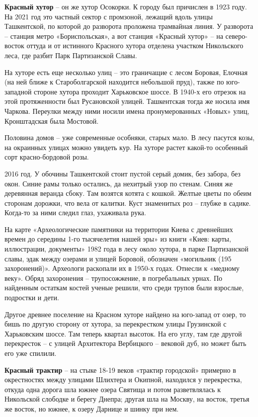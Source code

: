 \medskip


\textbf{Красный хутор} – он же хутор Осокорки. К городу был причислен в 1923 году. На 2021 год это частный сектор с промзоной, лежащий вдоль улицы Ташкентской, по которой до разворота проложена трамвайная линия. У разворота – станция метро «Бориспольская», а вот станция «Красный хутор» – на северо-восток оттуда и от истинного Красного хутора отделена участком Никольского леса, где разбит Парк Партизанской Славы.

На хуторе есть еще несколько улиц – это граничащие с лесом Боровая, Елочная (на ней ближе к Староболгарской находится небольшой пруд), также по юго-западной стороне хутора проходит Харьковское шоссе. В 1940-х его отрезок на этой протяженности был Русановской улицей. Ташкентская тогда же носила имя Чаркова. Переулки между ними носили имена пронумерованных «Новых» улиц, Кронштадская была Мостовой.

Половина домов – уже современные особняки, старых мало. В лесу пасутся козы, на окраинных улицах можно увидеть кур. На хуторе растет какой-то особенный сорт красно-бордовой розы.

2016 год. У обочины Ташкентской стоит пустой серый домик, без забора, без окон. Синие рамы только остались, да нехитрый узор по стенам. Синяя же деревянная веранда сбоку. Там возятся котята с кошкой. Желтые цветы по обеим сторонам дорожки, что вела от калитки. Куст знаменитых роз – глубже в садике. Когда-то за ними следил глаз, ухаживала рука.

На карте «Археологические памятники на территории Киева с древнейших времен до середины 1-го тысячелетия нашей эры» из книги «Киев: карты, иллюстрации, документы» 1982 года в лесу около хутора, в парке Партизанской славы, эдак между озерами и улицей Боровой, обозначен «могильник (195 захоронений)». Археологи раскопали их в 1950-х годах. Отнесли к «медному веку». Обряд захоронения – трупосожжение, в погребальных урнах. По найденным остаткам костей ученые решили, что среди трупов были взрослые, подростки и дети.

Другое древнее поселение на Красном хуторе найдено на юго-запад от озер, то бишь по другую сторону от хутора, за перекрестком улицы Грузинской с Харьковским шоссе. Там теперь квартал высоток. На его углу, там где другой перекресток – с улицей Архитектора Вербицкого – вековой дуб, но может быть его уже спилили.\\

\medskip


\textbf{Красный трактир} – на стыке 18-19 веков «трактир городской» примерно в окрестностях между улицами Шлихтера и Окипной, находился у перекрестка, откуда одна дорога шла южнее озера Святища и потом разветвлялась к Никольской слободке и берегу Днепра; другая шла на Москву, на восток, третья же восток, но южнее, к озеру Дарнице и шинку при нем.\\ 

